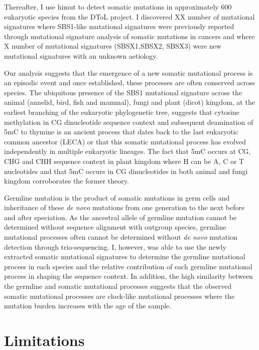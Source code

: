 Thereafter, I use himut to detect somatic mutations in approximately 600 eukaryotic species from the DToL project. I discovered XX number of mutational signatures where SBS1-like mutational signatures were previously reported through mutational signature analysis of somatic mutations in cancers \cite{Alexandrov2020-ys} and where X number of mutational signatures (SBSX1,SBSX2, SBSX3) were new mutational signatures with an unknown aetiology.

Our analysis suggests that the emergence of a new somatic mutational process is an episodic event and once established, these processes are often conserved across species. The ubiquitous presence of the SBS1 mutational signature across the animal (annelid, bird, fish and mammal), fungi and plant (dicot) kingdom, at the earliest branching of the eukaryotic phylogenetic tree, suggests that cytosine methylation in CG dinucleotide sequence context and subsequent deamination of 5mC to thymine is an ancient process that dates back to the last eukaryotic common ancestor (LECA) or that this somatic mutational process has evolved independently in multiple eukaryotic lineages. The fact that 5mC occurs at CG, CHG and CHH sequence context in plant kingdom where H can be A, C or T nucleotides \cite{Henderson2007-mm} and that 5mC occurs in CG dinucleotides in both animal and fungi kingdom \cite{Bewick2019-tu} corroborates the former theory. 

Germline mutation is the product of somatic mutations in germ cells and inheritance of these \textit{de novo} mutations from one generation to the next before and after speciation. As the ancestral allele of germline mutation cannot be determined without sequence alignment with outgroup species, germline mutational processes often cannot be determined without \textit{de novo} mutation detection through trio-sequencing. I, however, was able to use the newly extracted somatic mutational signatures to determine the germline mutational process in each species and the relative contribution of each germline mutational process in shaping the sequence context. In addition, the high similarity between the germline and somatic mutational processes suggests that the observed somatic mutational processes are clock-like mutational processes where the mutation burden increases with the age of the sample. 

\section{Limitations}


